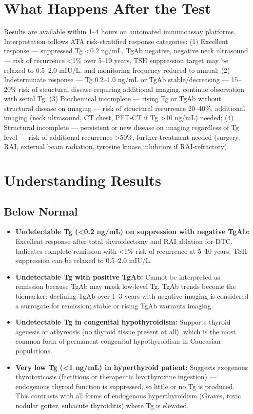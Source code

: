 \section*{What Happens After the Test}
Results are available within 1--4 hours on automated immunoassay platforms. Interpretation follows ATA risk-stratified response categories: (1) Excellent response --- suppressed Tg <0.2 ng/mL, TgAb negative, negative neck ultrasound --- risk of recurrence <1\% over 5--10 years, TSH suppression target may be relaxed to 0.5--2.0 mIU/L, and monitoring frequency reduced to annual; (2) Indeterminate response --- Tg 0.2--1.0 ng/mL or TgAb stable/decreasing --- 15--20\% risk of structural disease requiring additional imaging, continue observation with serial Tg; (3) Biochemical incomplete --- rising Tg or TgAb without structural disease on imaging --- risk of structural recurrence 20--40\%, additional imaging (neck ultrasound, CT chest, PET-CT if Tg >10 ng/mL) needed; (4) Structural incomplete --- persistent or new disease on imaging regardless of Tg level --- risk of additional recurrence >50\%, further treatment needed (surgery, RAI, external beam radiation, tyrosine kinase inhibitors if RAI-refractory).

\section*{Understanding Results}

\subsection*{Below Normal}
\begin{itemize}
  \item \textbf{Undetectable Tg (<0.2 ng/mL) on suppression with negative TgAb:} Excellent response after total thyroidectomy and RAI ablation for DTC. Indicates complete remission with <1\% risk of recurrence at 5--10 years. TSH suppression can be relaxed to 0.5--2.0 mIU/L.
  \item \textbf{Undetectable Tg with positive TgAb:} Cannot be interpreted as remission because TgAb may mask low-level Tg. TgAb trends become the biomarker: declining TgAb over 1--3 years with negative imaging is considered a surrogate for remission; stable or rising TgAb warrants imaging.
  \item \textbf{Undetectable Tg in congenital hypothyroidism:} Supports thyroid agenesis or athyreosis (no thyroid tissue present at all), which is the most common form of permanent congenital hypothyroidism in Caucasian populations.
  \item \textbf{Very low Tg (<1 ng/mL) in hyperthyroid patient:} Suggests exogenous thyrotoxicosis (factitious or therapeutic levothyroxine ingestion) --- endogenous thyroid function is suppressed, so little or no Tg is produced. This contrasts with all forms of endogenous hyperthyroidism (Graves, toxic nodular goiter, subacute thyroiditis) where Tg is elevated.
\end{itemize}

